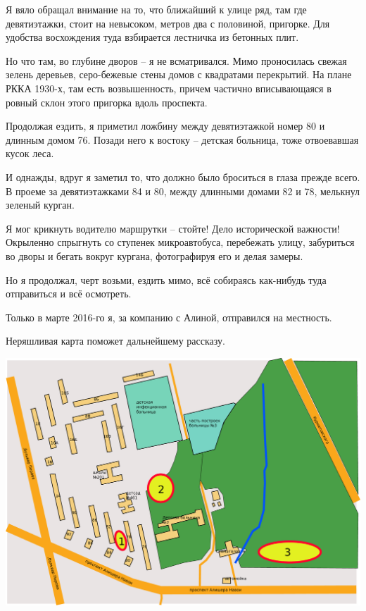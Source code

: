 Я вяло обращал внимание на то, что ближайший к улице ряд, там где девятиэтажки, стоит на невысоком, метров два с половиной, пригорке. Для удобства восхождения туда взбирается лестничка из бетонных плит.

Но что там, во глубине дворов – я не всматривался. Мимо проносилась свежая зелень деревьев, серо-бежевые стены домов с квадратами перекрытий. На плане РККА 1930-х, там есть возвышенность, причем частично вписывающаяся в ровный склон этого пригорка вдоль проспекта. 

Продолжая ездить, я приметил ложбину между девятиэтажкой номер 80 и длинным домом 76. Позади него к востоку – детская больница, тоже отвоевавшая кусок леса.

И однажды, вдруг я заметил то, что должно было броситься в глаза прежде всего. В проеме за девятиэтажками 84 и 80, между длинными домами 82 и 78, мелькнул зеленый курган.

Я мог крикнуть водителю маршрутки – стойте! Дело исторической важности! Окрыленно спрыгнуть со ступенек микроавтобуса, перебежать улицу, забуриться во дворы и бегать вокруг кургана, фотографируя его и делая замеры.

Но я продолжал, черт возьми, ездить мимо, всё собираясь как-нибудь туда отправиться и всё осмотреть.

Только в марте 2016-го я, за компанию с Алиной, отправился на местность.

Неряшливая карта поможет дальнейшему рассказу.

\begin{center}
\includegraphics[width=\textwidth]{chast-gorodki/kurgany/vosk-gorodishe.pdf}
\end{center}

